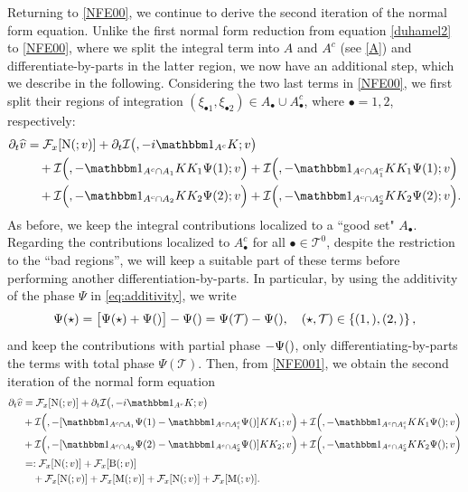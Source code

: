 \documentclass[%
11pt,  reqno]{amsart}
\makeatletter
\newcommand{\5}{\textup{V}}
\newcommand{\ft}{\widehat}
\newcommand{\ind}{\mathbbm 1}
\newcommand{\dt}{\partial_t}
\theoremstyle{remark}
\newcommand{\bul}{\bullet}
\newcommand{\TT}{\mathcal{T}}
\newcommand{\Ft}{{\mathcal{F}}}
\def\<#1>{\csname MH@symb@#1\endcsname}
\def\distC{15}
\newcommand{\cherry}[3]{
	\begin{tikzpicture}[
		baseline=-8, scale=0.6, every node/.style={dotA},
		level distance=15pt,
		level 1/.style={sibling distance=\distC pt}
		]
		\node  [label=above:{$#1$}]  (root) {}
		child
		child
		;
		\node [label= left:{$#2$}]  at (root-1) {};
		\node [label= right:{$#3$}] at (root-2) {};
	\end{tikzpicture}
}
\newcommand{\Ical}{\mathcal{I}}
\numberwithin{equation}{section}
\numberwithin{theorem}{section}
\newcommand{\MM}{\mathrm{M}}
\newcommand{\NN}{\mathrm{N}}
\newcommand{\BB}{\mathrm{B}}
\makeatother
\begin{document}
Returning to \eqref{NFE00}, we continue to derive the second iteration of the normal form equation. 
Unlike the first normal form reduction from equation \eqref{duhamel2} to \eqref{NFE00}, where we split the integral term into $A$ and $A^c$ (see \eqref{A}) and differentiate-by-parts in the latter region, we now have an additional step, which we describe in the following. Considering the two last terms in \eqref{NFE00}, we first split their regions of integration $(\xi_{\bul1}, \xi_{\bul2}) \in A_\bul \cup A_\bul^c$, where $\bul = 1,2$, respectively:
\begin{align}
\label{NFE001}
\dt\ft v
&
= 
 \Ft_x[ \NN ( \<1>; v )]  
+ 
\dt \Ical \big( \<1>, -i  \ind_{A^c} K; v \big)
\\
&
\quad 
+
\Ical \Big( \<21>, - \ind_{A^c \cap A_1} KK_1\Psi(1) ; v  \Big)  
+
\Ical \Big( \<21>, - \ind_{A^c \cap A_1^c} KK_1\Psi(1) ; v  \Big) 
\\
&
\quad 
+
\Ical \Big( \<22>, - \ind_{A^c \cap A_2} KK_2\Psi(2) ; v  \Big) 
+
\Ical \Big( \<22>, - \ind_{A^c \cap A_2^c} KK_2\Psi(2) ; v  \Big) .
\end{align}
As before, we keep the integral contributions localized to a ``good set" $A_\bul$. Regarding the contributions localized to $A_\bul^c$ for all $\bul\in \TT^0$, despite the restriction to the ``bad regions'', we will keep a suitable part of these terms before performing another differentiation-by-parts. In particular, by using the additivity of the phase $\Psi$ in \eqref{eq:additivity}, we write
\begin{align}
\Psi(\star) 
= \big[ \Psi(\star) + \Psi(\<1>) \big]- \Psi(\<1>) 
=
\Psi(\TT) - \Psi(\<1>),
\quad (\star, \TT)\in \left\{ (1, \<21>) , (2, \<22>) \right\},
\end{align}
and keep the contributions with partial phase $-\Psi(\<1>)$, only differentiating-by-parts the terms with total phase $\Psi(\TT)$. Then, from \eqref{NFE001}, we obtain the second iteration of the normal form equation
\begin{align}
\dt\ft v
&
= 
 \Ft_x[ \NN ( \<1>; v )] 
+ 
\dt \Ical \big( \<1>, - i  \ind_{A^c} K; v \big)
\\
&
+
\Ical \Big( \<21>, -[ \ind_{A^c \cap A_1} \Psi(1) - \ind_{A^c \cap A_1^c} \Psi(\<1>)  ]KK_1 ; v  \Big) 
+
\Ical \Big( \<21>, - \ind_{A^c \cap A_1^c} KK_1\Psi(\<21>) ; v  \Big) 
\\
&
+
\Ical \Big( \<22>, - [\ind_{A^c \cap A_2} \Psi(2) - \ind_{A^c \cap A_2^c} \Psi(\<1>)  ] KK_2; v  \Big) 
+
\Ical \Big( \<22>, - \ind_{A^c \cap A_2^c} KK_2\Psi(\<22>) ; v  \Big) 
\\
&
= : 
 \Ft_x[ \NN ( \<1>; v )]  
+ 
 \Ft_x[ 
\BB(\<1>;v)
] 
\\
&
\quad 
+ 
 \Ft_x[ 
\NN(\<21>; v )
] 
+
 \Ft_x[ 
\MM(\<21>; v )
] 
+
 \Ft_x[ 
\NN(\<22>; v)
]  
+
 \Ft_x[ 
\MM(\<22>;v)
]  
.
\label{NFE002}
\end{align}
\end{document}
